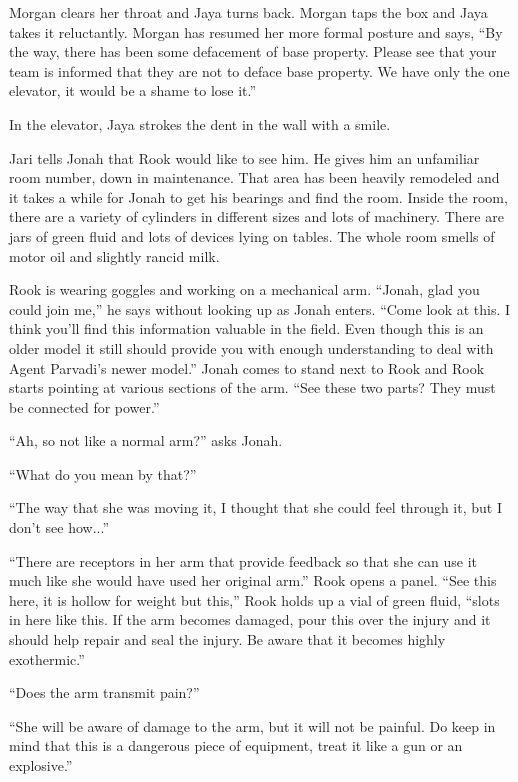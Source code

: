 Morgan clears her throat and Jaya turns back.  Morgan taps the box and Jaya takes it reluctantly.  Morgan has resumed her more formal posture and says, ``By the way, there has been some defacement of base property.  Please see that your team is informed that they are not to deface base property.  We have only the one elevator, it would be a shame to lose it.''

In the elevator, Jaya strokes the dent in the wall with a smile.





Jari tells Jonah that Rook would like to see him.  He gives him an unfamiliar room number, down in maintenance.  That area has been heavily remodeled and it takes a while for Jonah to get his bearings and find the room.  Inside the room, there are a variety of cylinders in different sizes and lots of machinery.  There are jars of green fluid and lots of devices lying on tables. The whole room smells of motor oil and slightly rancid milk.



Rook is wearing goggles and working on a mechanical arm.  ``Jonah, glad you could join me,'' he says without looking up as Jonah enters.  ``Come look at this.  I think you'll find this information valuable in the field.  Even though this is an older model it still should provide you with enough understanding to deal with Agent Parvadi's newer model.''  Jonah comes to stand next to Rook and Rook starts pointing at various sections of the arm. ``See these two parts?  They must be connected for power.''

``Ah, so not like a normal arm?'' asks Jonah.

``What do you mean by that?''

``The way that she was moving it, I thought that she could feel through it, but I don't see how...''

``There are receptors in her arm that provide feedback so that she can use it much like she would have used her original arm.''  Rook opens a panel. ``See this here, it is hollow for weight but this,'' Rook holds up a vial of green fluid, ``slots in here like this.  If the arm becomes damaged, pour this over the injury and it should help repair and seal the injury.  Be aware that it becomes highly exothermic.''

``Does the arm transmit pain?''

``She will be aware of damage to the arm, but it will not be painful.  Do keep in mind that this is a dangerous piece of equipment, treat it like a gun or an explosive.''

